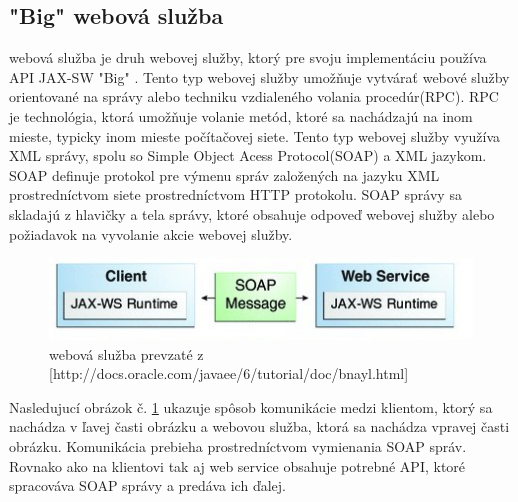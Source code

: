 \subsection{"Big" webová služba}\label{bigkap}
 webová služba je druh webovej služby, ktorý pre svoju implementáciu používa API JAX-SW\cite{fitWeb} "Big" . Tento typ webovej služby umožňuje vytvárať webové služby orientované na správy alebo techniku vzdialeného volania procedúr(RPC). RPC je technológia, ktorá umožňuje volanie metód, ktoré sa nachádzajú na inom mieste, typicky inom mieste počítačovej siete. Tento typ webovej služby využíva XML správy, spolu so Simple Object Acess Protocol(SOAP) a XML jazykom. SOAP definuje protokol pre výmenu správ založených na jazyku XML prostredníctvom siete prostredníctvom HTTP protokolu. SOAP správy sa skladajú z hlavičky a tela správy, ktoré obsahuje odpoveď webovej služby alebo požiadavok na vyvolanie akcie webovej služby.
\begin{figure}[htb]

\begin{center}

\includegraphics[scale=0.5]{webservice.jpg} 
\caption{ webová služba  prevzaté z [http://docs.oracle.com/javaee/6/tutorial/doc/bnayl.html] }
\label{com}

\end{center}

\end{figure}
Nasledujucí obrázok č. \ref{com} ukazuje spôsob komunikácie medzi klientom, ktorý sa nachádza v ľavej časti obrázku a webovou služba, ktorá sa nachádza vpravej časti obrázku. Komunikácia prebieha prostredníctvom vymienania SOAP správ. Rovnako ako na klientovi tak aj web service obsahuje potrebné API, ktoré spracováva SOAP správy a predáva ich ďalej.

